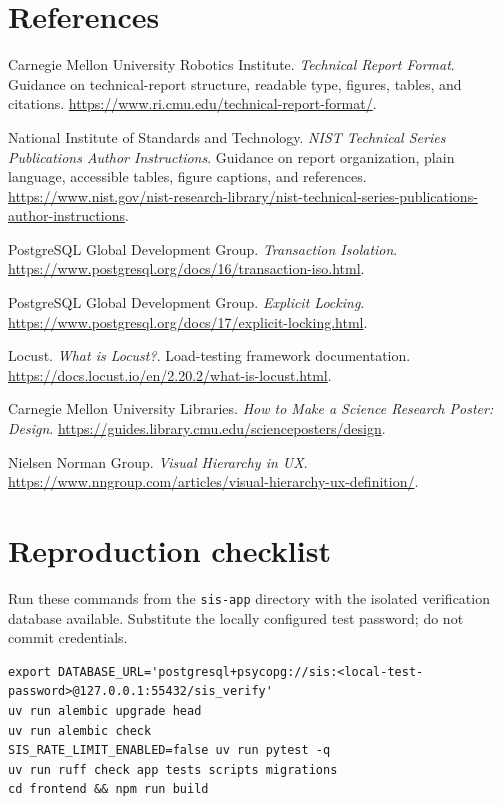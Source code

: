 \documentclass[11pt,a4paper,oneside]{report}
\begin{document}
\chapter*{References}
\begin{enumerate}[label={[\arabic*]},leftmargin=2.1em,itemsep=6pt]
\item Carnegie Mellon University Robotics Institute. \textit{Technical Report Format}. Guidance on technical-report structure, readable type, figures, tables, and citations. \url{https://www.ri.cmu.edu/technical-report-format/}.
\item National Institute of Standards and Technology. \textit{NIST Technical Series Publications Author Instructions}. Guidance on report organization, plain language, accessible tables, figure captions, and references. \url{https://www.nist.gov/nist-research-library/nist-technical-series-publications-author-instructions}.
\item PostgreSQL Global Development Group. \textit{Transaction Isolation}. \url{https://www.postgresql.org/docs/16/transaction-iso.html}.
\item PostgreSQL Global Development Group. \textit{Explicit Locking}. \url{https://www.postgresql.org/docs/17/explicit-locking.html}.
\item Locust. \textit{What is Locust?}. Load-testing framework documentation. \url{https://docs.locust.io/en/2.20.2/what-is-locust.html}.
\item Carnegie Mellon University Libraries. \textit{How to Make a Science Research Poster: Design}. \url{https://guides.library.cmu.edu/scienceposters/design}.
\item Nielsen Norman Group. \textit{Visual Hierarchy in UX}. \url{https://www.nngroup.com/articles/visual-hierarchy-ux-definition/}.
\end{enumerate}

\appendix
\chapter{Reproduction checklist}
Run these commands from the \texttt{sis-app} directory with the isolated verification database available. Substitute the locally configured test password; do not commit credentials.
\begin{lstlisting}[basicstyle=\ttfamily\scriptsize,breaklines=true,breakatwhitespace=false,columns=fullflexible,frame=single,rulecolor=\color{rulegray},backgroundcolor=\color{papergray}]
export DATABASE_URL='postgresql+psycopg://sis:<local-test-password>@127.0.0.1:55432/sis_verify'
uv run alembic upgrade head
uv run alembic check
SIS_RATE_LIMIT_ENABLED=false uv run pytest -q
uv run ruff check app tests scripts migrations
cd frontend && npm run build
\end{lstlisting}
\end{document}

